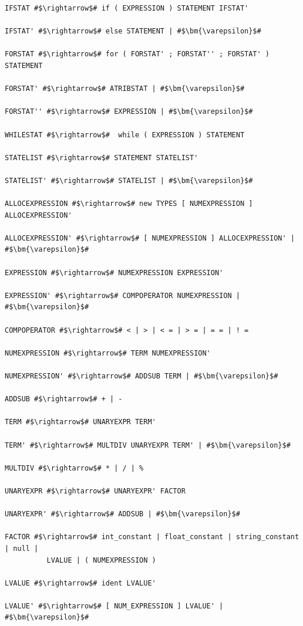 \documentclass[
	12pt,				%
	openright,			%
	twoside,			%
	a4paper,			%
	english,			%
	french,				%
	spanish,			%
	brazil				%
	]{abntex2}
\begin{document}
\begin{lstlisting}[escapechar=\#]
IFSTAT #$\rightarrow$# if ( EXPRESSION ) STATEMENT IFSTAT'  

IFSTAT' #$\rightarrow$# else STATEMENT | #$\bm{\varepsilon}$#  

FORSTAT #$\rightarrow$# for ( FORSTAT' ; FORSTAT'' ; FORSTAT' ) STATEMENT  

FORSTAT' #$\rightarrow$# ATRIBSTAT | #$\bm{\varepsilon}$#  

FORSTAT'' #$\rightarrow$# EXPRESSION | #$\bm{\varepsilon}$#  

WHILESTAT #$\rightarrow$#  while ( EXPRESSION ) STATEMENT 

STATELIST #$\rightarrow$# STATEMENT STATELIST'  

STATELIST' #$\rightarrow$# STATELIST | #$\bm{\varepsilon}$#  

ALLOCEXPRESSION #$\rightarrow$# new TYPES [ NUMEXPRESSION ] ALLOCEXPRESSION' 

ALLOCEXPRESSION' #$\rightarrow$# [ NUMEXPRESSION ] ALLOCEXPRESSION' | #$\bm{\varepsilon}$#  

EXPRESSION #$\rightarrow$# NUMEXPRESSION EXPRESSION'  

EXPRESSION' #$\rightarrow$# COMPOPERATOR NUMEXPRESSION | #$\bm{\varepsilon}$#  

COMPOPERATOR #$\rightarrow$# < | > | < = | > = | = = | ! = 

NUMEXPRESSION #$\rightarrow$# TERM NUMEXPRESSION' 

NUMEXPRESSION' #$\rightarrow$# ADDSUB TERM | #$\bm{\varepsilon}$#  

ADDSUB #$\rightarrow$# + | - 

TERM #$\rightarrow$# UNARYEXPR TERM' 

TERM' #$\rightarrow$# MULTDIV UNARYEXPR TERM' | #$\bm{\varepsilon}$#   

MULTDIV #$\rightarrow$# * | / | %  

UNARYEXPR #$\rightarrow$# UNARYEXPR' FACTOR  

UNARYEXPR' #$\rightarrow$# ADDSUB | #$\bm{\varepsilon}$#  

FACTOR #$\rightarrow$# int_constant | float_constant | string_constant | null |
          LVALUE | ( NUMEXPRESSION ) 

LVALUE #$\rightarrow$# ident LVALUE' 

LVALUE' #$\rightarrow$# [ NUM_EXPRESSION ] LVALUE' | #$\bm{\varepsilon}$#  
\end{lstlisting}
\end{document}
